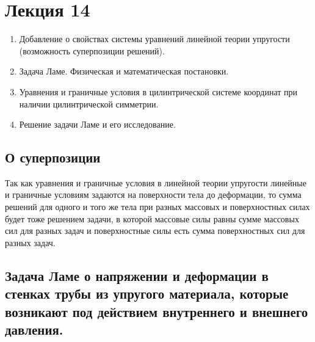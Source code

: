 \section{Лекция 14}
\begin{enumerate}
\item  Добавление о свойствах системы уравнений линейной теории упругости (возможность суперпозиции решений).
\item Задача Ламе. Физическая и математическая постановки.
\item Уравнения и граничные условия в цилинтрической системе координат при наличии цилинтрической симметрии.
\item Решение задачи Ламе и его исследование.
\end{enumerate}
\subsection{О суперпозиции}
Так как уравнения и граничные условия в линейной теории упругости линейные и граничные условиям задаются на поверхности тела до деформации, то сумма решений для одного и того же тела при разных массовых и поверхностных силах будет тоже решением задачи, в которой массовые силы равны сумме массовых сил для разных задач и поверхностные силы есть сумма поверхностных сил для разных задач.

\subsection{Задача Ламе о напряжении и деформации в стенках трубы из упругого материала, которые возникают под действием внутреннего и внешнего давления.}

